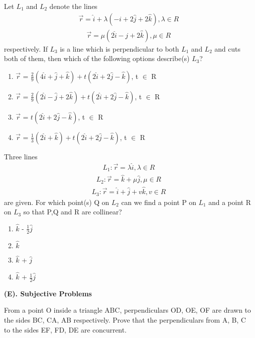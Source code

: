 \item Let $L_1$ and $L_2$ denote the lines 
\begin{align*}
\overrightarrow{r} = \hat{i} + \lambda(-\hat{i} + 2\hat{j} + 2\hat{k}), \lambda \in R
\end{align*}
\begin{align*}
\overrightarrow{r} = \mu(2\hat{i} - \hat{j} + 2\hat{k}), \mu \in R
\end{align*}
respectively. If $L_3$ is a line which is perpendicular to both $L_1$ and $L_2$ and cuts both of them, then which of the following options describe(s) $L_3$?
\begin{enumerate}
\item $\overrightarrow{r}$ = $\frac{2}{9}(4\hat{i} + \hat{j} + \hat{k}) + t(2\hat{i} + 2\hat{j} - \hat{k})$, t $\in$ R
\item $\overrightarrow{r}$ = $\frac{2}{9}(2\hat{i} - \hat{j} + 2\hat{k}) + t(2\hat{i} + 2\hat{j} - \hat{k})$, t $\in$ R
\item $\overrightarrow{r}$ = $t(2\hat{i} + 2\hat{j} - \hat{k})$, t $\in$ R
\item $\overrightarrow{r}$ = $\frac{1}{3}(2\hat{i} + \hat{k}) + t(2\hat{i} + 2\hat{j} - \hat{k})$, t $\in$ R
\end{enumerate}

\item Three lines 
\begin{align*}
L_1: \overrightarrow{r} = \lambda\hat{i}, \lambda \in R
\end{align*}
\begin{align*}
L_2: \overrightarrow{r} = \hat{k} + \mu\hat{j}, \mu \in R
\end{align*}
\begin{align*}
L_3: \overrightarrow{r} = \hat{i} + \hat{j} + v\hat{k}, v \in R
\end{align*}
are given. For which point(s) Q on $L_2$ can we find a point P on $L_1$ and a point R on $L_3$ so that P,Q and R are collinear?
\begin{enumerate}
\item $\hat{k}$ - $\frac{1}{2}\hat{j}$
\item $\hat{k}$
\item $\hat{k}$ + $\hat{j}$
\item $\hat{k}$ + $\frac{1}{2}\hat{j}$
\end{enumerate}

\textbf{(E). Subjective Problems}

\item From a point O inside a triangle ABC, perpendiculars OD, OE, OF are drawn to the sides BC, CA, AB respectively. Prove that the perpendiculars from A, B, C to the sides EF, FD, DE are concurrent.

